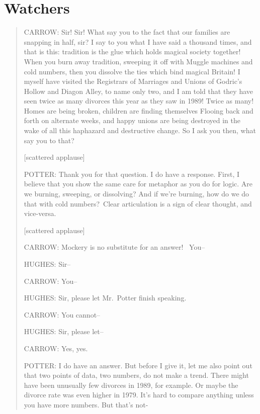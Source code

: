 \hypertarget{watchers}{%
\chapter{Watchers}\label{watchers}}

\begin{quote}
{\capnums{}CARROW:} Sir! Sir! What say you to the fact that our families
are snapping in half, sir? I say to you what I have said a thousand
times, and that is this: tradition is the glue which holds magical
society together! When you burn away tradition, sweeping it off with
Muggle machines and cold numbers, then you dissolve the ties which bind
magical Britain! I myself have visited the Registrars of Marriages and
Unions of Godric's Hollow and Diagon Alley, to name only two, and I am
told that they have seen twice as many divorces this year as they saw in
1989! Twice as many! Homes are being broken, children are finding
themselves Flooing back and forth on alternate weeks, and happy unions
are being destroyed in the wake of all this haphazard and destructive
change. So I ask you then, what say you to that?

{[}scattered applause{]}

{\capnums{}POTTER:} Thank you for that question. I do have a response.
First, I believe that you show the same care for metaphor as you do for
logic. Are we burning, sweeping, or dissolving? And if we're burning,
how do we do that with cold numbers?~Clear articulation is a sign of
clear thought, and vice-versa.

{[}scattered applause{]}

{\capnums{}CARROW:} Mockery is no substitute for an answer! ~You--

{\capnums{}HUGHES:} Sir--

{\capnums{}CARROW:} You--

{\capnums{}HUGHES:} Sir, please let Mr.~Potter finish speaking.

{\capnums{}CARROW:} You cannot--

{\capnums{}HUGHES:} Sir, please let--

{\capnums{}CARROW:} Yes, yes.

{\capnums{}POTTER:} I do have an answer. But before I give it, let me
also point out that two points of data, two numbers, do not make a
trend. There might have been unusually few divorces in 1989, for
example. Or maybe the divorce rate was even higher in 1979. It's hard to
compare anything unless you have more numbers. But that's not-


\end{quote}
